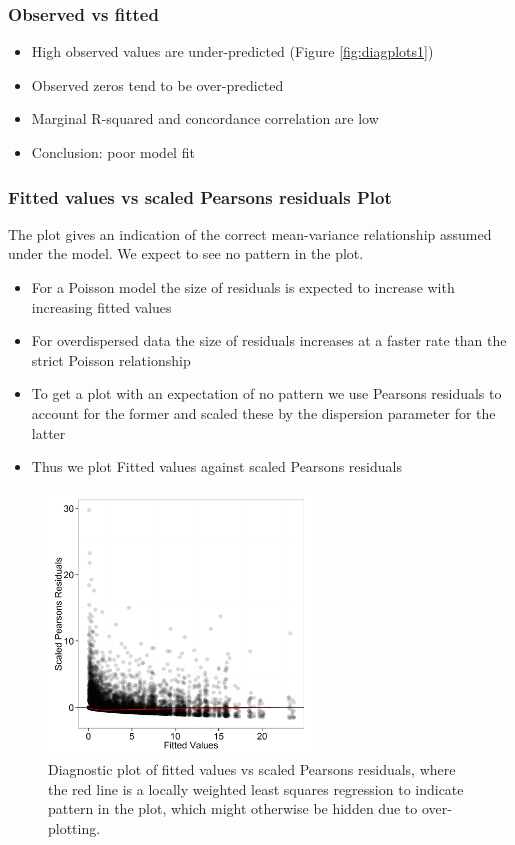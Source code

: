 \documentclass[11pt, a4paper]{article}
\begin{document}
\begin{frame}
\frametitle{Observed vs fitted}
\begin{itemize}
\item High observed values are under-predicted (Figure \ref{fig:diagplots1})
\item Observed zeros tend to be over-predicted
\item Marginal R-squared and concordance correlation are low
\pause
\bigskip
\item Conclusion: poor model fit
\end{itemize}
\end{frame}


\begin{frame}[fragile]
\frametitle{Fitted values vs scaled Pearsons residuals Plot}
The plot gives an indication of the correct mean-variance relationship assumed under the model.  We expect to see no pattern in the plot.  

\begin{itemize}
\item For a Poisson model the size of residuals is expected to increase with increasing fitted values
\item For overdispersed data the size of residuals increases at a faster rate than the strict Poisson relationship
\item To get a plot with an expectation of no pattern we use Pearsons residuals to account for the former and scaled these by the dispersion parameter for the latter
\item Thus we plot Fitted values against scaled Pearsons residuals
\end{itemize}
\end{frame}

\begin{frame}[fragile]
\begin{figure}[h]
  \centering
    \includegraphics[width=7cm]{FitPlots_resids.png}
  \caption{Diagnostic plot of fitted values vs scaled Pearsons residuals, where the red line is a locally weighted least squares regression to indicate pattern in the plot, which might otherwise be hidden due to over-plotting.}
  \label{fig:diagplots2}
\end{figure}
\end{frame}
\end{document}
